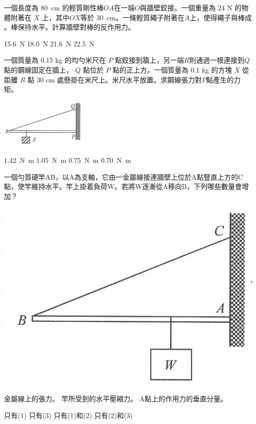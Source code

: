 {
     \bigskip\par
    一個長度為 \qty{80}{cm} 的輕質剛性棒$OA$在一端$O$與牆壁鉸接。一個重量為 24 N 的物體附著在 $X$ 上，其中$OX$等於 \qty{30}{cm}。一條輕質繩子附著在$A$上，使得繩子與棒成 。棒保持水平。計算牆壁對棒的反作用力。
    \begin{tasks}
        \task \qty{15.6}{N}
        \task \qty{18.0}{N}
        \task \qty{21.6}{N}
        \task \qty{22.5}{N}
    \end{tasks}

}{}

{
    一個質量為 0.15 kg 的均勻米尺在 $P$ 點鉸接到牆上，另一端$R$則通過一根連接到$Q$點的鋼線固定在牆上， $Q$ 點位於 $P$ 點的正上方。一個質量為 0.1 kg 的方塊 $X$ 從距離 $R$ 點 30 cm 處懸掛在米尺上。米尺水平放置。求鋼線張力對$P$點產生的力矩。 \bigskip
    {\par\centering
        \includegraphics[width=0.33\textwidth]{assets/84e42251.png}
        \par} \bigskip
    \begin{tasks}
        \task \qty{1.42}{N.m}
        \task \qty{1.05}{N.m}
        \task \qty{0.75}{N.m}
        \task \qty{0.70}{N.m}
    \end{tasks}
}{}

{
一個勻質硬竿AB，以A為支軸，它由一金屬線接連牆壁上位於A點豎直上方的C點，使竿維持水平。竿上掛着負荷W。若將W逐漸從A移向B，下列哪些數量會增加？
{\par\centering
\includegraphics[width=.3\textwidth]{assets/a9b14a8d.png}
\par}
\begin{statements}
    \task 金屬線上的張力。
    \task 竿所受到的水平壓縮力。
    \task A點上的作用力的垂直分量。
\end{statements}
\begin{tasks}
    \task 只有(1)
    \task 只有(3)
    \task 只有(1)和(2)
    \task 只有(2)和(3)
\end{tasks}
}{}

